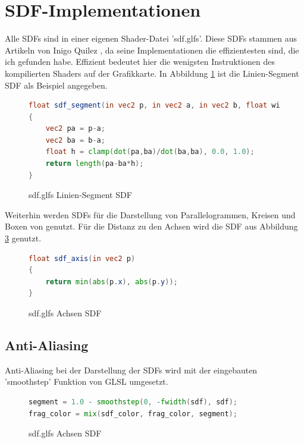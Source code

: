 \section{SDF-Implementationen}
Alle SDFs sind in einer eigenen Shader-Datei 'sdf.glfs'.
Diese SDFs stammen aus Artikeln von Inigo Quilez \cite{Inigo}, da seine Implementationen die effizientesten sind, die ich gefunden habe.
Effizient bedeutet hier die wenigsten Instruktionen des kompilierten Shaders auf der Grafikkarte.
In Abbildung \ref{fig:code_sdf1} ist die Linien-Segment SDF als Beispiel angegeben.
\begin{figure}[ht]
	\begin{lstlisting}[language=GLSL]
float sdf_segment(in vec2 p, in vec2 a, in vec2 b, float wi)
{
    vec2 pa = p-a;
    vec2 ba = b-a;
    float h = clamp(dot(pa,ba)/dot(ba,ba), 0.0, 1.0);
    return length(pa-ba*h);
}
	\end{lstlisting}
	\caption{sdf.glfs Linien-Segment SDF}
	\label{fig:code_sdf1}
\end{figure}
\FloatBarrier
\par
Weiterhin werden SDFs für die Darstellung von Parallelogrammen, Kreisen und Boxen von \cite{Inigo} genutzt.
Für die Distanz zu den Achsen wird die SDF aus Abbildung \ref{fig:code_sdf2} genutzt.
\begin{figure}[ht]
	\begin{lstlisting}[language=GLSL]
float sdf_axis(in vec2 p)
{
    return min(abs(p.x), abs(p.y));
}
	\end{lstlisting}
	\caption{sdf.glfs Achsen SDF}
	\label{fig:code_sdf2}
\end{figure}
\FloatBarrier

\subsection{Anti-Aliasing}
Anti-Aliasing bei der Darstellung der SDFs wird mit der eingebauten 'smoothstep' Funktion von GLSL umgesetzt.
\begin{figure}[ht]
	\begin{lstlisting}[language=GLSL]
segment = 1.0 - smoothstep(0, -fwidth(sdf), sdf);
frag_color = mix(sdf_color, frag_color, segment);
	\end{lstlisting}
	\caption{sdf.glfs Achsen SDF}
	\label{fig:code_sdf2}
\end{figure}
\FloatBarrier


